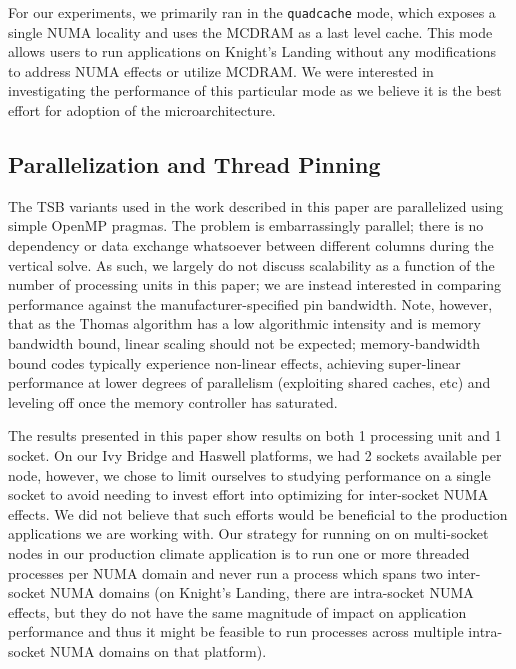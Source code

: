 \documentclass[conference]{IEEEtran}
\begin{document}
For our experiments, we primarily ran in the \lstinline{quadcache} mode, which
exposes a single NUMA locality and uses the MCDRAM as a last level cache. This
mode allows users to run applications on Knight's Landing without any
modifications to address NUMA effects or utilize MCDRAM. We were interested in
investigating the performance of this particular mode as we believe it is the
best effort for adoption of the microarchitecture.


\subsection{Parallelization and Thread Pinning}

The TSB variants used in the work described in this paper are parallelized
using simple OpenMP pragmas. The problem is embarrassingly parallel; there is
no dependency or data exchange whatsoever between different columns during the
vertical solve. As such, we largely do not discuss scalability as a function of
the number of processing units in this paper; we are instead interested in
comparing performance against the manufacturer-specified pin bandwidth. Note,
however, that as the Thomas algorithm has a low algorithmic intensity and is
memory bandwidth bound, linear scaling should not be expected; memory-bandwidth
bound codes typically experience non-linear effects, achieving super-linear
performance at lower degrees of parallelism (exploiting shared caches, etc) and
leveling off once the memory controller has saturated.

The results presented in this paper show results on both 1 processing unit and
1 socket. On our Ivy Bridge and Haswell platforms, we had 2 sockets available
per node, however, we chose to limit ourselves to studying performance on a
single socket to avoid needing to invest effort into optimizing for
inter-socket NUMA effects. We did not believe that such efforts would be
beneficial to the production applications we are working with. Our strategy for
running on on multi-socket nodes in our production climate application is to
run one or more threaded processes per NUMA domain and never run a process
which spans two inter-socket NUMA domains (on Knight's Landing, there are
intra-socket NUMA effects, but they do not have the same magnitude of impact on
application performance and thus it might be feasible to run processes across
multiple intra-socket NUMA domains on that platform). 
\end{document}
